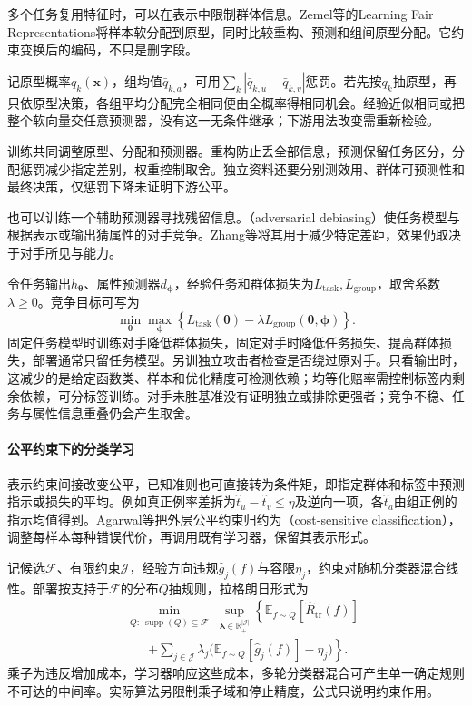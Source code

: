 多个任务复用特征时，可以在表示中限制群体信息。Zemel等的Learning Fair Representations将样本软分配到原型，同时比较重构、预测和组间原型分配。它约束变换后的编码，不只是删字段。

记原型概率$q_k(\bm{x})$，组均值$\bar q_{k,a}$，可用$\sum_k|\bar q_{k,u}-\bar q_{k,v}|$惩罚。若先按$q_k$抽原型，再只依原型决策，各组平均分配完全相同便由全概率得相同机会。经验近似相同或把整个软向量交任意预测器，没有这一无条件继承；下游用法改变需重新检验。

训练共同调整原型、分配和预测器。重构防止丢全部信息，预测保留任务区分，分配惩罚减少指定差别，权重控制取舍。独立资料还要分别测效用、群体可预测性和最终决策，仅惩罚下降未证明下游公平。

也可以训练一个辅助预测器寻找残留信息。（adversarial debiasing）使任务模型与根据表示或输出猜属性的对手竞争。Zhang等将其用于减少特定差距，效果仍取决于对手所见与能力。

令任务输出$h_{\bm{\theta}}$、属性预测器$d_{\bm{\phi}}$，经验任务和群体损失为$L_{\mathrm{task}},L_{\mathrm{group}}$，取舍系数$\lambda\geq0$。竞争目标可写为
\[
 \min_{\bm{\theta}}\max_{\bm{\phi}}
 \left\{L_{\mathrm{task}}(\bm{\theta})
       -\lambda L_{\mathrm{group}}(\bm{\theta},\bm{\phi})\right\}.
\]
固定任务模型时训练对手降低群体损失，固定对手时降低任务损失、提高群体损失，部署通常只留任务模型。另训独立攻击者检查是否绕过原对手。只看输出时，这减少的是给定函数类、样本和优化精度可检测依赖；均等化赔率需控制标签内剩余依赖，可分标签训练。对手未胜基准没有证明独立或排除更强者；竞争不稳、任务与属性信息重叠仍会产生取舍。

\paragraph{公平约束下的分类学习}

表示约束间接改变公平，已知准则也可直接转为条件矩，即指定群体和标签中预测指示或损失的平均。例如真正例率差拆为$\hat t_u-\hat t_v\leq\eta$及逆向一项，各$\hat t_a$由组正例的指示均值得到。Agarwal等把外层公平约束归约为（cost-sensitive classification），调整每样本每种错误代价，再调用既有学习器，保留其表示形式。

记候选$\mathcal F$、有限约束$\mathcal J$，经验方向违规$\hat g_j(f)$与容限$\eta_j$，约束对随机分类器混合线性。部署按支持于$\mathcal F$的分布$Q$抽规则，拉格朗日形式为
\begin{equation}
\begin{aligned}
 &\min_{\substack{Q:\ \operatorname{supp}(Q)\subseteq\mathcal F}}
 \sup_{\bm{\lambda}\in\mathbb R_+^{|\mathcal J|}}
 \left\{\mathbb E_{f\sim Q}[\widehat R_{\mathrm{tr}}(f)]\right.\\
 &\qquad\left.+
 \sum_{j\in\mathcal J}\lambda_j
 \bigl(\mathbb E_{f\sim Q}[\hat g_j(f)]-\eta_j\bigr)
 \right\}.
\end{aligned}
 \label{eq:fairness-reduction}
\end{equation}
乘子为违反增加成本，学习器响应这些成本，多轮分类器混合可产生单一确定规则不可达的中间率。实际算法另限制乘子域和停止精度，公式只说明约束作用。

